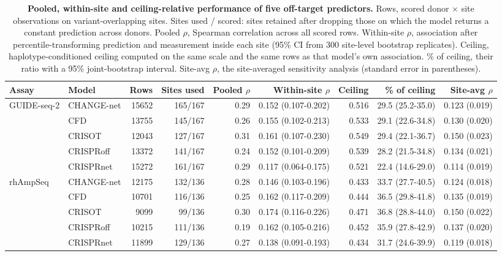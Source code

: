 \begin{table}[htbp]
\centering
\caption{\textbf{Pooled, within-site and ceiling-relative performance of five off-target predictors.} Rows, scored donor $\times$ site observations on variant-overlapping sites. Sites used / scored: sites retained after dropping those on which the model returns a constant prediction across donors. Pooled $\rho$, Spearman correlation across all scored rows. Within-site $\rho$, association after percentile-transforming prediction and measurement inside each site (95\% CI from 300 site-level bootstrap replicates). Ceiling, haplotype-conditioned ceiling computed on the same scale and the same rows as that model's own association. \% of ceiling, their ratio with a 95\% joint-bootstrap interval. Site-avg $\rho$, the site-averaged sensitivity analysis (standard error in parentheses).}\label{tab1}
\footnotesize
\begin{tabular}{@{}llrrrrrrr@{}}
\toprule
Assay & Model & Rows & Sites used & Pooled $\rho$ & Within-site $\rho$ & Ceiling & \% of ceiling & Site-avg $\rho$ \\
\midrule
GUIDE-seq-2 & CHANGE-net & 15652 & 165/167 & 0.29 & 0.152 (0.107-0.202) & 0.516 & 29.5 (25.2-35.0) & 0.123 (0.019) \\
 & CFD & 13755 & 145/167 & 0.26 & 0.155 (0.102-0.213) & 0.533 & 29.1 (22.6-34.8) & 0.130 (0.020) \\
 & CRISOT & 12043 & 127/167 & 0.31 & 0.161 (0.107-0.230) & 0.549 & 29.4 (22.1-36.7) & 0.150 (0.023) \\
 & CRISPRoff & 13372 & 141/167 & 0.24 & 0.152 (0.101-0.209) & 0.539 & 28.2 (21.5-34.8) & 0.134 (0.021) \\
 & CRISPRnet & 15272 & 161/167 & 0.29 & 0.117 (0.064-0.175) & 0.521 & 22.4 (14.6-29.0) & 0.114 (0.019) \\
\midrule
rhAmpSeq & CHANGE-net & 12175 & 132/136 & 0.28 & 0.146 (0.103-0.196) & 0.433 & 33.7 (27.7-40.5) & 0.124 (0.018) \\
 & CFD & 10701 & 116/136 & 0.25 & 0.162 (0.117-0.209) & 0.444 & 36.5 (29.8-41.8) & 0.135 (0.019) \\
 & CRISOT & 9099 & 99/136 & 0.30 & 0.174 (0.116-0.226) & 0.471 & 36.8 (28.8-44.0) & 0.150 (0.022) \\
 & CRISPRoff & 10215 & 111/136 & 0.19 & 0.162 (0.105-0.216) & 0.452 & 35.9 (27.8-42.9) & 0.137 (0.020) \\
 & CRISPRnet & 11899 & 129/136 & 0.27 & 0.138 (0.091-0.193) & 0.434 & 31.7 (24.6-39.9) & 0.119 (0.018) \\
\bottomrule
\end{tabular}
\end{table}

